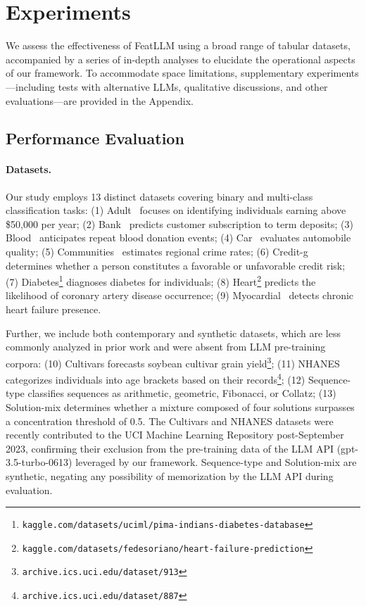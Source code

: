 \section{Experiments}
We assess the effectiveness of \textsf{FeatLLM} using a broad range of tabular datasets, accompanied by a series of in-depth analyses to elucidate the operational aspects of our framework. To accommodate space limitations, supplementary experiments—including tests with alternative LLMs, qualitative discussions, and other evaluations—are provided in the Appendix.

\subsection{Performance Evaluation}
\paragraph{Datasets.}
Our study employs 13 distinct datasets covering binary and multi-class classification tasks: (1) Adult~\cite{asuncion2007uci} focuses on identifying individuals earning above \$50,000 per year; (2) Bank~\cite{moro2014data} predicts customer subscription to term deposits; (3) Blood~\cite{yeh2009knowledge} anticipates repeat blood donation events; (4) Car~\cite{kadra2021well} evaluates automobile quality; (5) Communities~\cite{misc_communities_and_crime_183} estimates regional crime rates; (6) Credit-g~\cite{kadra2021well} determines whether a person constitutes a favorable or unfavorable credit risk; (7) Diabetes\footnote{\texttt{kaggle.com/datasets/uciml/pima-indians-diabetes-database}} diagnoses diabetes for individuals; (8) Heart\footnote{\texttt{kaggle.com/datasets/fedesoriano/heart-failure-prediction}} predicts the likelihood of coronary artery disease occurrence; (9) Myocardial~\cite{misc_myocardial_infarction_complications_579} detects chronic heart failure presence.

Further, we include both contemporary and synthetic datasets, which are less commonly analyzed in prior work and were absent from LLM pre-training corpora: (10) Cultivars forecasts soybean cultivar grain yield\footnote{\texttt{archive.ics.uci.edu/dataset/913}}; (11) NHANES categorizes individuals into age brackets based on their records\footnote{\texttt{archive.ics.uci.edu/dataset/887}}; (12) Sequence-type classifies sequences as arithmetic, geometric, Fibonacci, or Collatz; (13) Solution-mix determines whether a mixture composed of four solutions surpasses a concentration threshold of 0.5. The Cultivars and NHANES datasets were recently contributed to the UCI Machine Learning Repository post-September 2023, confirming their exclusion from the pre-training data of the LLM API (gpt-3.5-turbo-0613) leveraged by our framework. Sequence-type and Solution-mix are synthetic, negating any possibility of memorization by the LLM API during evaluation.

